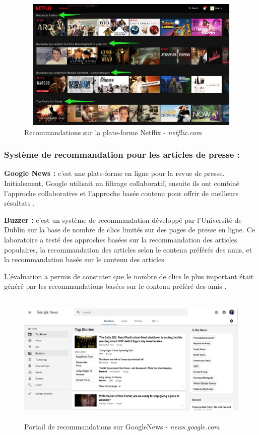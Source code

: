\begin{figure}[H]
    \centering
    \includegraphics[height=180pt,width=350pt]{img/chapter1/netflix.jpg}
    \caption{Recommandations sur la plate-forme Netflix - \emph{netflix.com}}
\end{figure}

\subsubsection{Système de recommandation pour les articles de presse :} 

\textbf{Google News :} c'est une plate-forme en ligne pour la revue de presse. Initialement, Google utilisait un filtrage collaboratif, ensuite ils ont combiné l'approche collaborative et l'approche basée contenu pour offrir de meilleurs résultats \cite{gglnews}.

\textbf{Buzzer :} c'est un système de recommandation développé par l'Université de Dublin sur la base de nombre de clics limités sur des pages de presse en ligne. Ce laboratoire a testé des approches basées sur la recommandation des articles populaires, la recommandation des articles selon le contenu préférés des amis, et la recommandation basée sur le contenu des articles. 

L'évaluation a permis de constater que le nombre de clics le plus important était généré par les recommandations basées sur le contenu préféré des amis \cite{gglnews}.\\
\begin{figure}[H]
    \centering
    \includegraphics[height=180pt,width=350pt]{img/chapter1/news.jpg}
    \caption{Portail de recommandations sur GoogleNews - \emph{news.google.com}}
\end{figure}

